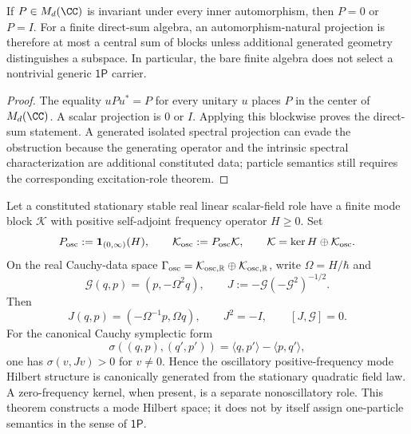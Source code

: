 \documentclass[12pt,a4paper]{article}
\begin{document}
\begin{proposition}
\label{p4:prop:bare-algebra-one-particle-no-selector}
If \(P\in M_d(\CC)\) is invariant under every inner automorphism, then
\(P=0\) or \(P=I\).  For a finite direct-sum algebra, an
automorphism-natural projection is therefore at most a central sum of blocks
unless additional generated geometry distinguishes a subspace.  In
particular, the bare finite algebra does not select a nontrivial generic
\(\mathsf{1P}\) carrier.
\end{proposition}

\begin{proof}
The equality \(uPu^*=P\) for every unitary \(u\) places \(P\) in the center
of \(M_d(\CC)\).  A scalar projection is \(0\) or \(I\).  Applying this
blockwise proves the direct-sum statement.  A generated isolated spectral
projection can evade the obstruction because the generating operator and
the intrinsic spectral characterization are additional constituted data;
particle semantics still requires the corresponding excitation-role theorem.
\end{proof}

\begin{theorem}
\label{p4:thm:stationary-positive-frequency-mode-space}
Let a constituted stationary stable real linear scalar-field role have a finite
mode block \(\mathcal K\) with positive self-adjoint frequency operator
\(H\ge0\).  Set
\[
  P_{\rm osc}:=\mathbf1_{(0,\infty)}(H),
  \qquad
  \mathcal K_{\rm osc}:=P_{\rm osc}\mathcal K,
  \qquad
  \mathcal K=\ker H\oplus\mathcal K_{\rm osc}.
\]
On the real Cauchy-data space
\(\Gamma_{\rm osc}=\mathcal K_{\rm osc,\mathbb R}\oplus
\mathcal K_{\rm osc,\mathbb R}\), write \(\Omega=H/\hbar\) and
\[
  \mathcal G(q,p)=(p,-\Omega^2q),
  \qquad
  J:=-\mathcal G(-\mathcal G^2)^{-1/2}.
\]
Then
\[
  J(q,p)=(-\Omega^{-1}p,\Omega q),
  \qquad J^2=-I,
  \qquad [J,\mathcal G]=0.
\]
For the canonical Cauchy symplectic form
\[
 \sigma((q,p),(q',p'))=\langle q,p'\rangle-\langle p,q'\rangle,
\]
one has \(\sigma(v,Jv)>0\) for \(v\ne0\).  Hence the oscillatory
positive-frequency mode Hilbert structure is canonically generated from the
stationary quadratic field law.  A zero-frequency kernel, when present, is a
separate nonoscillatory role.  This theorem constructs a mode Hilbert space; it
does not by itself assign one-particle semantics in the sense of
\(\mathsf{1P}\).
\end{theorem}
\end{document}
